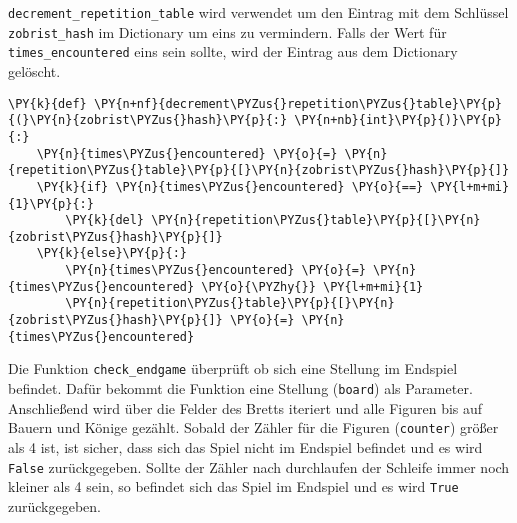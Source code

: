    \texttt{decrement\_repetition\_table} wird verwendet um den Eintrag mit
dem Schlüssel \texttt{zobrist\_hash} im Dictionary um eins zu
vermindern. Falls der Wert für \texttt{times\_encountered} eins sein
sollte, wird der Eintrag aus dem Dictionary gelöscht.

\bigskip

    \begin{tcolorbox}[fontupper=\linespread{.66}\selectfont, breakable, size=fbox, boxrule=1pt, pad at break*=1mm,colback=cellbackground, colframe=cellborder]
\begin{Verbatim}[commandchars=\\\{\}]
\PY{k}{def} \PY{n+nf}{decrement\PYZus{}repetition\PYZus{}table}\PY{p}{(}\PY{n}{zobrist\PYZus{}hash}\PY{p}{:} \PY{n+nb}{int}\PY{p}{)}\PY{p}{:}
    \PY{n}{times\PYZus{}encountered} \PY{o}{=} \PY{n}{repetition\PYZus{}table}\PY{p}{[}\PY{n}{zobrist\PYZus{}hash}\PY{p}{]}
    \PY{k}{if} \PY{n}{times\PYZus{}encountered} \PY{o}{==} \PY{l+m+mi}{1}\PY{p}{:}
        \PY{k}{del} \PY{n}{repetition\PYZus{}table}\PY{p}{[}\PY{n}{zobrist\PYZus{}hash}\PY{p}{]}
    \PY{k}{else}\PY{p}{:}
        \PY{n}{times\PYZus{}encountered} \PY{o}{=} \PY{n}{times\PYZus{}encountered} \PY{o}{\PYZhy{}} \PY{l+m+mi}{1}
        \PY{n}{repetition\PYZus{}table}\PY{p}{[}\PY{n}{zobrist\PYZus{}hash}\PY{p}{]} \PY{o}{=} \PY{n}{times\PYZus{}encountered}
\end{Verbatim}
\end{tcolorbox}

    Die Funktion \texttt{check\_endgame} überprüft ob sich eine Stellung im
Endspiel befindet. Dafür bekommt die Funktion eine Stellung
(\texttt{board}) als Parameter. Anschließend wird über die Felder des
Bretts iteriert und alle Figuren bis auf Bauern und Könige gezählt.
Sobald der Zähler für die Figuren (\texttt{counter}) größer als 4 ist,
ist sicher, dass sich das Spiel nicht im Endspiel befindet und es wird
\texttt{False} zurückgegeben. Sollte der Zähler nach durchlaufen der
Schleife immer noch kleiner als 4 sein, so befindet sich das Spiel im
Endspiel und es wird \texttt{True} zurückgegeben.

\bigskip

